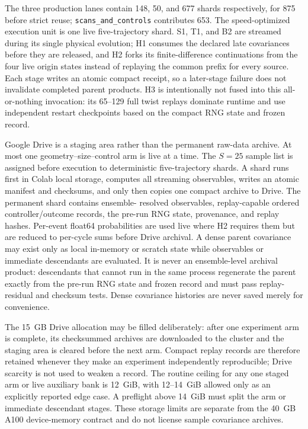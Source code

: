\documentclass[aps,prx,twocolumn,floatfix,nofootinbib,superscriptaddress,longbibliography]{revtex4-2}
\newcommand{\code}[1]{\texttt{#1}}
\begin{document}
The three production lanes contain 148, 50, and 677 shards respectively, for 875 before
strict reuse; \code{scans\_and\_controls} contributes 653.  The speed-optimized execution
unit is one live five-trajectory shard.  S1, T1, and B2 are
streamed during its single physical evolution; H1 consumes the declared late covariances
before they are released, and H2 forks its finite-difference continuations from the four
live origin states instead of replaying the common prefix for every source.  Each stage
writes an atomic compact receipt, so a later-stage failure does not invalidate completed
parent products.  H3 is intentionally not fused into this all-or-nothing invocation: its
65--129 full twist replays dominate runtime and use independent restart checkpoints based
on the compact RNG state and frozen record.

Google Drive is a staging area rather than the permanent raw-data archive.  At most one
geometry--size--control arm is live at a time.  The $S=25$ sample list is assigned before
execution to deterministic five-trajectory shards.  A shard runs first in Colab local
storage, computes all streaming observables, writes an atomic manifest and checksums, and
only then copies one compact archive to Drive.  The permanent shard contains ensemble-
resolved observables, replay-capable ordered controller/outcome records, the pre-run RNG
state, provenance, and replay hashes.  Per-event float64 probabilities are used live where H2
requires them but are reduced to per-cycle sums before Drive archival.  A dense parent
covariance may exist only as local in-memory or scratch state while observables or immediate
descendants are evaluated.  It is never an ensemble-level archival product: descendants
that cannot run in the same process regenerate the parent exactly from the pre-run RNG
state and frozen record and must pass replay-residual and checksum tests.  Dense covariance
histories are never saved merely for convenience.

The 15~GB Drive allocation may be filled deliberately: after one experiment arm is
complete, its checksummed archives are downloaded to the cluster and the staging area is
cleared before the next arm.  Compact replay records are therefore retained whenever they
make an experiment independently reproducible; Drive scarcity is not used to weaken a
record.  The routine ceiling for any one staged arm or live auxiliary bank is 12~GiB, with
12--14~GiB allowed only as an explicitly reported edge case.  A preflight above 14~GiB
must split the arm or immediate descendant stages.  These storage limits are separate from
the 40~GB A100 device-memory contract and do not license sample covariance archives.
\end{document}
